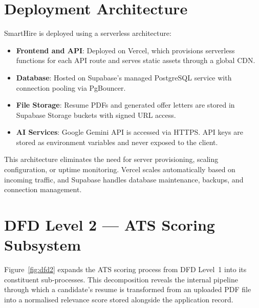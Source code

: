 \section{Deployment Architecture}
\label{sec:deployment}

SmartHire is deployed using a serverless architecture:

\begin{itemize}[leftmargin=1.5em]
  \item \textbf{Frontend and API}: Deployed on Vercel, which provisions serverless functions for each API route and serves static assets through a global CDN.
  \item \textbf{Database}: Hosted on Supabase's managed PostgreSQL service with connection pooling via PgBouncer.
  \item \textbf{File Storage}: Resume PDFs and generated offer letters are stored in Supabase Storage buckets with signed URL access.
  \item \textbf{AI Services}: Google Gemini API is accessed via HTTPS. API keys are stored as environment variables and never exposed to the client.
\end{itemize}

This architecture eliminates the need for server provisioning, scaling configuration, or uptime monitoring. Vercel scales automatically based on incoming traffic, and Supabase handles database maintenance, backups, and connection management.

\section{DFD Level 2 --- ATS Scoring Subsystem}
\label{sec:dfd2}

Figure~\ref{fig:dfd2} expands the ATS scoring process from DFD Level~1 into its constituent sub-processes. This decomposition reveals the internal pipeline through which a candidate's resume is transformed from an uploaded PDF file into a normalised relevance score stored alongside the application record.

